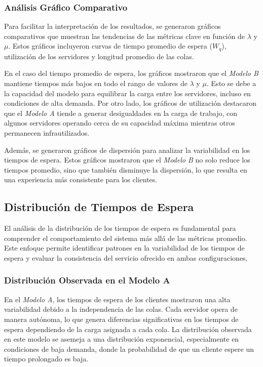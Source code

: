\documentclass[a4paper,12pt]{article}
\begin{document}
\subsubsection{Análisis Gráfico Comparativo}

Para facilitar la interpretación de los resultados, se generaron gráficos comparativos que muestran las tendencias de las métricas clave en función de \( \lambda \) y \( \mu \). Estos gráficos incluyeron curvas de tiempo promedio de espera (\( W_q \)), utilización de los servidores y longitud promedio de las colas. 

En el caso del tiempo promedio de espera, los gráficos mostraron que el \textit{Modelo B} mantiene tiempos más bajos en todo el rango de valores de \( \lambda \) y \( \mu \). Esto se debe a la capacidad del modelo para equilibrar la carga entre los servidores, incluso en condiciones de alta demanda. Por otro lado, los gráficos de utilización destacaron que el \textit{Modelo A} tiende a generar desigualdades en la carga de trabajo, con algunos servidores operando cerca de su capacidad máxima mientras otros permanecen infrautilizados.

Además, se generaron gráficos de dispersión para analizar la variabilidad en los tiempos de espera. Estos gráficos mostraron que el \textit{Modelo B} no solo reduce los tiempos promedio, sino que también disminuye la dispersión, lo que resulta en una experiencia más consistente para los clientes.

\subsection{Distribución de Tiempos de Espera}

El análisis de la distribución de los tiempos de espera es fundamental para comprender el comportamiento del sistema más allá de las métricas promedio. Este enfoque permite identificar patrones en la variabilidad de los tiempos de espera y evaluar la consistencia del servicio ofrecido en ambas configuraciones.

\subsubsection{Distribución Observada en el Modelo A}

En el \textit{Modelo A}, los tiempos de espera de los clientes mostraron una alta variabilidad debido a la independencia de las colas. Cada servidor opera de manera autónoma, lo que genera diferencias significativas en los tiempos de espera dependiendo de la carga asignada a cada cola. La distribución observada en este modelo se asemeja a una distribución exponencial, especialmente en condiciones de baja demanda, donde la probabilidad de que un cliente espere un tiempo prolongado es baja.
\end{document}

